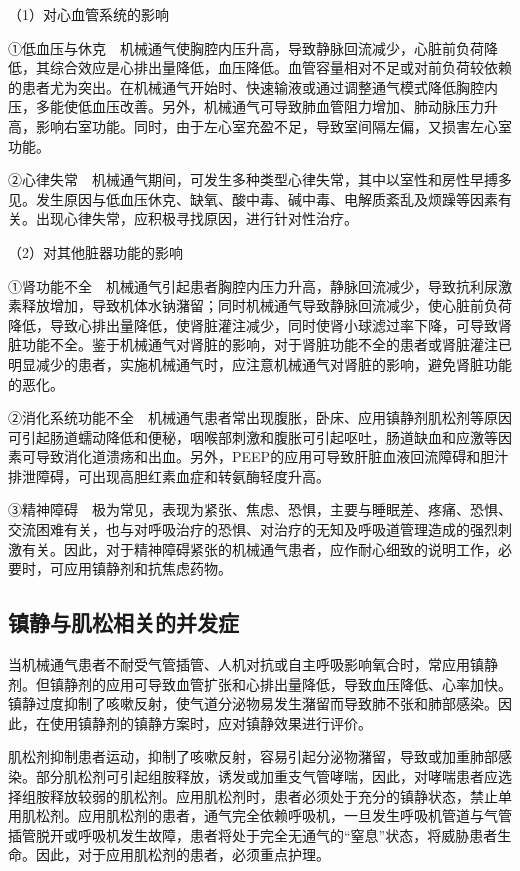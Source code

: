 （1）对心血管系统的影响

①低血压与休克　机械通气使胸腔内压升高，导致静脉回流减少，心脏前负荷降低，其综合效应是心排出量降低，血压降低。血管容量相对不足或对前负荷较依赖的患者尤为突出。在机械通气开始时、快速输液或通过调整通气模式降低胸腔内压，多能使低血压改善。另外，机械通气可导致肺血管阻力增加、肺动脉压力升高，影响右室功能。同时，由于左心室充盈不足，导致室间隔左偏，又损害左心室功能。

②心律失常　机械通气期间，可发生多种类型心律失常，其中以室性和房性早搏多见。发生原因与低血压休克、缺氧、酸中毒、碱中毒、电解质紊乱及烦躁等因素有关。出现心律失常，应积极寻找原因，进行针对性治疗。

（2）对其他脏器功能的影响

①肾功能不全　机械通气引起患者胸腔内压力升高，静脉回流减少，导致抗利尿激素释放增加，导致机体水钠潴留；同时机械通气导致静脉回流减少，使心脏前负荷降低，导致心排出量降低，使肾脏灌注减少，同时使肾小球滤过率下降，可导致肾脏功能不全。鉴于机械通气对肾脏的影响，对于肾脏功能不全的患者或肾脏灌注已明显减少的患者，实施机械通气时，应注意机械通气对肾脏的影响，避免肾脏功能的恶化。

②消化系统功能不全　机械通气患者常出现腹胀，卧床、应用镇静剂肌松剂等原因可引起肠道蠕动降低和便秘，咽喉部刺激和腹胀可引起呕吐，肠道缺血和应激等因素可导致消化道溃疡和出血。另外，PEEP的应用可导致肝脏血液回流障碍和胆汁排泄障碍，可出现高胆红素血症和转氨酶轻度升高。

③精神障碍　极为常见，表现为紧张、焦虑、恐惧，主要与睡眠差、疼痛、恐惧、交流困难有关，也与对呼吸治疗的恐惧、对治疗的无知及呼吸道管理造成的强烈刺激有关。因此，对于精神障碍紧张的机械通气患者，应作耐心细致的说明工作，必要时，可应用镇静剂和抗焦虑药物。

\subsection{镇静与肌松相关的并发症}

当机械通气患者不耐受气管插管、人机对抗或自主呼吸影响氧合时，常应用镇静剂。但镇静剂的应用可导致血管扩张和心排出量降低，导致血压降低、心率加快。镇静过度抑制了咳嗽反射，使气道分泌物易发生潴留而导致肺不张和肺部感染。因此，在使用镇静剂的镇静方案时，应对镇静效果进行评价。

肌松剂抑制患者运动，抑制了咳嗽反射，容易引起分泌物潴留，导致或加重肺部感染。部分肌松剂可引起组胺释放，诱发或加重支气管哮喘，因此，对哮喘患者应选择组胺释放较弱的肌松剂。应用肌松剂时，患者必须处于充分的镇静状态，禁止单用肌松剂。应用肌松剂的患者，通气完全依赖呼吸机，一旦发生呼吸机管道与气管插管脱开或呼吸机发生故障，患者将处于完全无通气的“窒息”状态，将威胁患者生命。因此，对于应用肌松剂的患者，必须重点护理。

